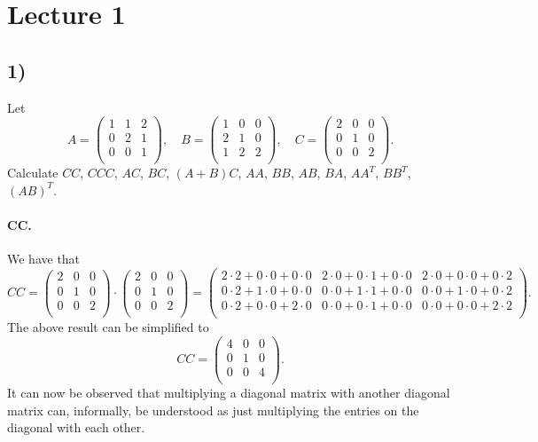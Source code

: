\section*{Lecture 1}

\subsection*{1)}
Let
\[ 
A = \begin{pmatrix}
1 & 1 & 2\\
0 & 2 & 1\\
0 & 0 & 1\\
\end{pmatrix}, \quad B = \begin{pmatrix}
1 & 0 & 0\\
2 & 1 & 0\\
1 & 2 & 2\\
\end{pmatrix}, \quad C = \begin{pmatrix}
2 & 0 & 0\\
0 & 1 & 0\\
0 & 0 & 2\\
\end{pmatrix}
.\]
Calculate $CC$, $CCC$, $AC$, $BC$, $(A+B)C$, $AA$, $BB$, $AB$, $BA$, $A A^{T}$, $BB^{T}$, $(AB)^{T}$.


\paragraph{CC.} We have that
\[ 
C C = \begin{pmatrix}
2 & 0 & 0\\
0 & 1 & 0\\
0 & 0 & 2\\
\end{pmatrix} \cdot \begin{pmatrix}
2 & 0 & 0\\
0 & 1 & 0\\
0 & 0 & 2\\
\end{pmatrix} = \begin{pmatrix}
2\cdot 2 + 0 \cdot 0 + 0 \cdot 0 & 2\cdot 0 + 0 \cdot 1 + 0 \cdot 0 & 2 \cdot 0 + 0 \cdot 0 + 0 \cdot 2\\
0 \cdot 2 + 1 \cdot 0 + 0 \cdot 0 & 0 \cdot 0 + 1 \cdot 1 + 0 \cdot 0 & 0 \cdot 0 + 1 \cdot 0 + 0 \cdot 2\\
0 \cdot 2 + 0 \cdot 0 + 2\cdot 0 & 0 \cdot 0 + 0 \cdot 1 + 0 \cdot 0 & 0 \cdot 0 + 0 \cdot 0 + 2 \cdot 2\\
\end{pmatrix}
.\]
The above result can be simplified to
\[ 
C C = \begin{pmatrix}
4 & 0 & 0\\
0 & 1 & 0\\
0 & 0 & 4\\
\end{pmatrix}
.\]
It can now be observed that multiplying a diagonal matrix with another diagonal matrix can, informally, be understood as just multiplying the entries on the diagonal with each other.

